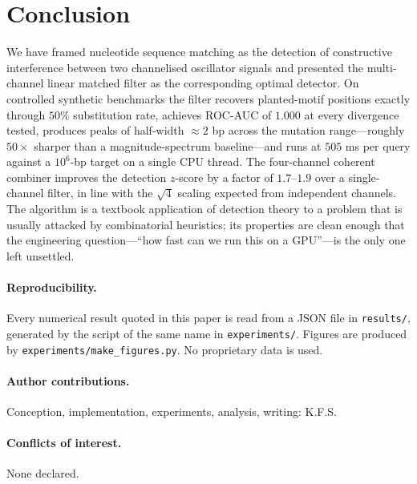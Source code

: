 \documentclass[twocolumn,11pt,a4paper]{article}
\theoremstyle{definition}
\theoremstyle{remark}
\begin{document}
\section{Conclusion}
\label{sec:conclusion}

We have framed nucleotide sequence matching as the detection of
constructive interference between two channelised oscillator signals
and presented the multi-channel linear matched filter as the
corresponding optimal detector. On controlled synthetic benchmarks the
filter recovers planted-motif positions exactly through $50\%$
substitution rate, achieves ROC-AUC of $1.000$ at every divergence
tested, produces peaks of half-width $\approx 2$ bp across the
mutation range---roughly $50 \times$ sharper than a magnitude-spectrum
baseline---and runs at $505$ ms per query against a $10^6$-bp target on
a single CPU thread. The four-channel coherent combiner improves the
detection $z$-score by a factor of $1.7$--$1.9$ over a single-channel
filter, in line with the $\sqrt{4}$ scaling expected from independent
channels. The algorithm is a textbook application of detection theory
to a problem that is usually attacked by combinatorial heuristics; its
properties are clean enough that the engineering question---``how fast
can we run this on a GPU''---is the only one left unsettled.

\paragraph{Reproducibility.} Every numerical result quoted in this
paper is read from a JSON file in \verb|results/|, generated by the
script of the same name in \verb|experiments/|. Figures are produced
by \verb|experiments/make_figures.py|. No proprietary data is used.

\paragraph{Author contributions.} Conception, implementation,
experiments, analysis, writing: K.F.S.

\paragraph{Conflicts of interest.} None declared.


\end{document}

